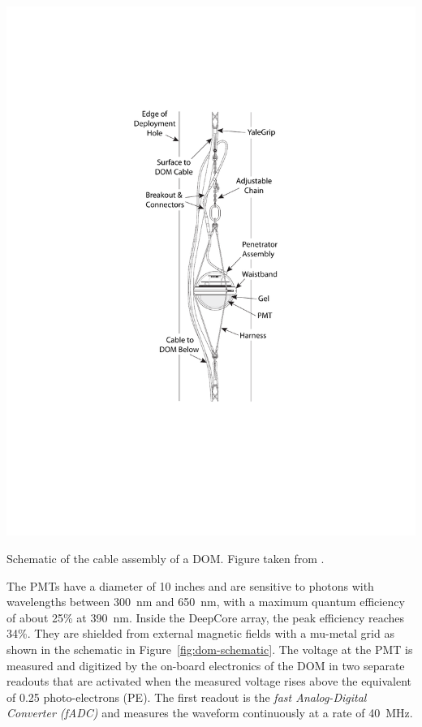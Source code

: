 \begin{marginfigure}
    \includegraphics[width=\textwidth]{figures/icecube/domfig2a-CableAssembly.pdf}
    \caption{Schematic of the cable assembly of a DOM. Figure taken from \cite{icecube_detector_17}.}
    \label{fig:dom-cable-assembly}
\end{marginfigure}
The PMTs have a diameter of 10 inches and are sensitive to photons with wavelengths between 300~nm and 650~nm, with a maximum quantum efficiency of about 25\% at 390~nm.
Inside the DeepCore array, the peak efficiency reaches 34\%.
They are shielded from external magnetic fields with a mu-metal grid as shown in the schematic in Figure~\ref{fig:dom-schematic}.
The voltage at the PMT is measured and digitized by the on-board electronics of the DOM in two separate readouts that are activated when the measured voltage rises above the equivalent of 0.25 photo-electrons (PE).
The first readout is the \emph{fast Analog-Digital Converter (fADC)} and measures the waveform continuously at a rate of 40~MHz.
